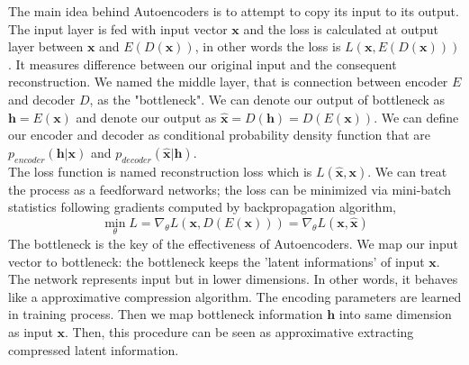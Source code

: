 \documentclass[11pt,twocolumn]{article}
\begin{document}
The main idea behind Autoencoders is to attempt to copy its input to its output. The input layer is fed with input vector $\mathbf{x}$ and the loss is calculated at output layer between $\mathbf{x}$ and $E(D(\mathbf{x}))$, in other words the loss is $L(\mathbf{x},E(D(\mathbf{x})))$. It measures difference between our original input and the consequent reconstruction.  We named the middle layer, that is connection between encoder $E$ and decoder $D$, as the "bottleneck". We can denote our output of bottleneck as $\mathbf{h} = E(\mathbf{x})$ and denote our output as $\mathbf{\hat{x}} = D(\mathbf{h}) = D(E(\mathbf{x}))$. We can define our encoder and decoder as conditional probability density function that are $p_{encoder}(\mathbf{h} | \mathbf{x})$ and $p_{decoder}(\mathbf{\hat{x}} | \mathbf{h})$. \\
The loss function is named reconstruction loss which is $L(\mathbf{\hat{x}},\mathbf{x})$. We can treat the process as a feedforward networks; the loss can be minimized via mini-batch statistics following gradients computed by backpropagation algorithm,
$$\min\limits_{\theta} L = \nabla_\theta L(\mathbf{x}, D(E(\mathbf{x}))) =\nabla_\theta L(\mathbf{x}, \mathbf{\hat{x}}) $$
The bottleneck is the key of the effectiveness of Autoencoders. We map our input vector to bottleneck: the bottleneck keeps the 'latent informations' of input $\mathbf{x}$. The network represents input but in lower dimensions. In other words, it behaves like a approximative compression algorithm. The encoding parameters are learned in training process. Then we map bottleneck information $\mathbf{h}$ into same dimension as input $\mathbf{x}$. Then, this procedure can be seen as approximative extracting compressed latent information.
\end{document}
